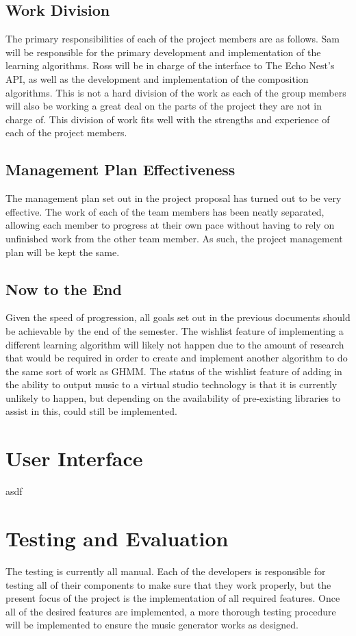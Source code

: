 \documentclass{article}
\begin{document}
\subsection{Work Division}
The primary responsibilities of each of the project members are as follows. Sam will be 
responsible for the primary development and implementation of the learning algorithms. Ross will 
be in charge of the interface to The Echo Nest's API, as well as the development and 
implementation of the composition algorithms. This is not a hard division of the work as each of 
the group members will also be working a great deal on the parts of the project they are not in 
charge of. This division of work fits well with the strengths and experience of each of the 
project members.

\subsection{Management Plan Effectiveness}
The management plan set out in the project proposal has turned out to be very effective. The work
of each of the team members has been neatly separated, allowing each member to progress at their
own pace without having to rely on unfinished work from the other team member. As such, the
project management plan will be kept the same.

\subsection{Now to the End}
Given the speed of progression, all goals set out in the previous documents should be achievable
by the end of the semester. The wishlist feature of implementing a different learning algorithm
will likely not happen due to the amount of research that would be required in order to create
and implement another algorithm to do the same sort of work as GHMM. The status of the wishlist
feature of adding in the ability to output music to a virtual studio technology is that it is
currently unlikely to happen, but depending on the availability of pre-existing libraries to 
assist in this, could still be implemented.

\section{User Interface}
asdf

\section{Testing and Evaluation}
The testing is currently all manual. Each of the developers is responsible for testing all of their
components to make sure that they work properly, but the present focus of the project is the 
implementation of all required features. Once all of the desired features are implemented, a
more thorough testing procedure will be implemented to ensure the music generator works as designed.
\end{document}
